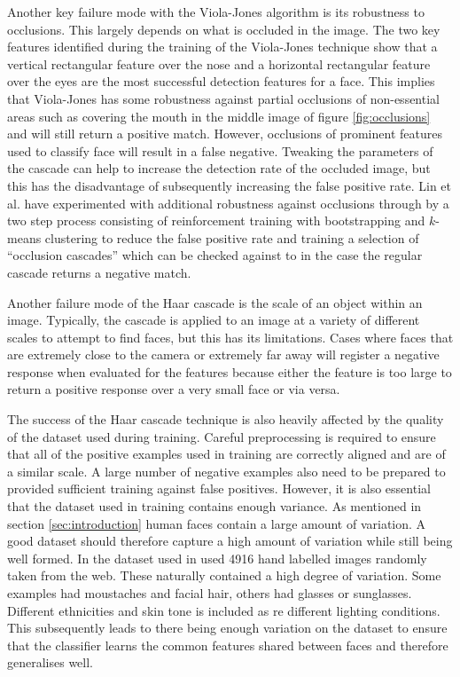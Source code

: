 \documentclass[conference]{IEEEtran}
\begin{document}
Another key failure mode with the Viola-Jones algorithm is its robustness to occlusions. This largely depends on what is occluded in the image. The two key features identified during the training of the Viola-Jones technique show that a vertical rectangular feature over the nose and a horizontal rectangular feature over the eyes are the most successful detection features for a face. This implies that Viola-Jones has some robustness against partial occlusions of non-essential areas such as covering the mouth in the middle image of figure \ref{fig:occlusions} and will still return a positive match. However, occlusions of prominent features used to classify face will result in a false negative. Tweaking the parameters of the cascade can help to increase the detection rate of the occluded image, but this has the disadvantage of subsequently increasing the false positive rate. Lin et al. \cite{lin2004fast} have experimented with additional robustness against occlusions through by a two step process consisting of reinforcement training with bootstrapping and $k$-means clustering to reduce the false positive rate and training a selection of ``occlusion cascades'' which can be checked against to in the case the regular cascade returns a negative match.

Another failure mode of the Haar cascade is the scale of an object within an image. Typically, the cascade is applied to an image at a variety of different scales to attempt to find faces, but this has its limitations. Cases where faces that are extremely close to the camera or extremely far away will register a negative response when evaluated for the features because either the feature is too large to return a positive response over a very small face or via versa.

The success of the Haar cascade technique is also heavily affected by the quality of the dataset used during training. Careful preprocessing is required to ensure that all of the positive examples used in training are correctly aligned and are of a similar scale. A large number of negative examples also need to be prepared to provided sufficient training against false positives. However, it is also essential that the dataset used in training contains enough variance. As mentioned in section \ref{sec:introduction} human faces contain a large amount of variation. A good dataset should therefore capture a high amount of variation while still being well formed. In the dataset used in \cite{viola2004robust} used 4916 hand labelled images randomly taken from the web. These naturally contained a high degree of variation. Some examples had moustaches and facial hair, others had glasses or sunglasses. Different ethnicities and skin tone is included as re different lighting conditions. This subsequently leads to there being enough variation on the dataset to ensure that the classifier learns the common features shared between faces and therefore generalises well.
\end{document}
